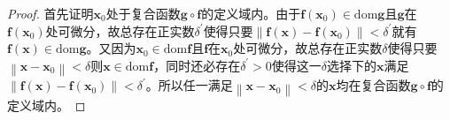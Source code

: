 \documentclass[main.tex]{subfiles}
\begin{document}
\begin{proof}
    首先证明$\mathbf{x}_0$处于复合函数$\mathbf{g}\circ\mathbf{f}$的定义域内。由于$\mathbf{f}\left(\mathbf{x}_0\right)\in\mathrm{dom}\mathbf{g}$且$\mathbf{g}$在$\mathbf{f}\left(\mathbf{x}_0\right)$处可微分，故总存在正实数$\delta^\prime$使得只要$\left\|\mathbf{f}\left(\mathbf{x}\right)-\mathbf{f}\left(\mathbf{x}_0\right)\right\|<\delta^\prime$就有$\mathbf{f}\left(\mathbf{x}\right)\in\mathrm{dom}\mathbf{g}$。又因为$\mathbf{x}_0\in\mathrm{dom}\mathbf{f}$且$\mathbf{f}$在$\mathbf{x}_0$处可微分，故总存在正实数$\delta$使得只要$\left\|\mathbf{x}-\mathbf{x}_0\right\|<\delta$则$\mathbf{x}\in\mathrm{dom}\mathbf{f}$，同时还必存在$\delta^\prime>0$使得这一$\delta$选择下的$\mathbf{x}$满足$\left\|\mathbf{f}\left(\mathbf{x}\right)-\mathbf{f}\left(\mathbf{x}_0\right)\right\|<\delta^\prime$。所以任一满足$\left\|\mathbf{x}-\mathbf{x}_0\right\|<\delta$的$\mathbf{x}$均在复合函数$\mathbf{g}\circ\mathbf{f}$的定义域内。


\end{proof}
\end{document}
